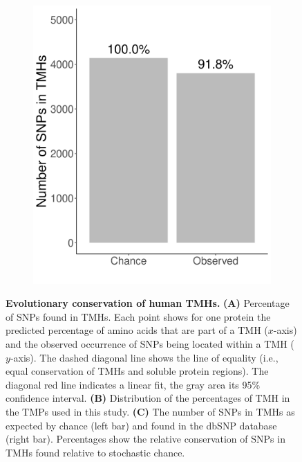 \begin{figure}[!htbp]
  
   \vfill

  \begin{subfigure}[t]{0.45\textwidth}
    \centering
    \caption{}
    \includegraphics[width=\linewidth]{ncbi_peregrine_results/fig_conservation.png}
    \label{fig:conservation}
  \end{subfigure}


  \caption{ \textbf{Evolutionary conservation of human TMHs.}
    \textbf{(A)} 
    Percentage of SNPs found in TMHs.
    Each point shows for one protein the predicted percentage of
    amino acids that are part of a TMH ($x$-axis) and the observed occurrence of SNPs being located
    within a TMH ($y$-axis).
    The dashed diagonal line shows the line of equality (i.e.,
    equal conservation of TMHs and soluble protein regions). 
    The diagonal red line indicates a linear fit, 
    the gray area its 95\% confidence interval.
    \textbf{(B)}
    Distribution of the percentages of TMH in the TMPs used in this study.
    \textbf{(C)}
    The number of SNPs in TMHs as expected by chance (left bar) 
    and found in the dbSNP database (right bar).
    Percentages show the relative conservation
    of SNPs in TMHs found relative to stochastic chance.
  }
\end{figure}

